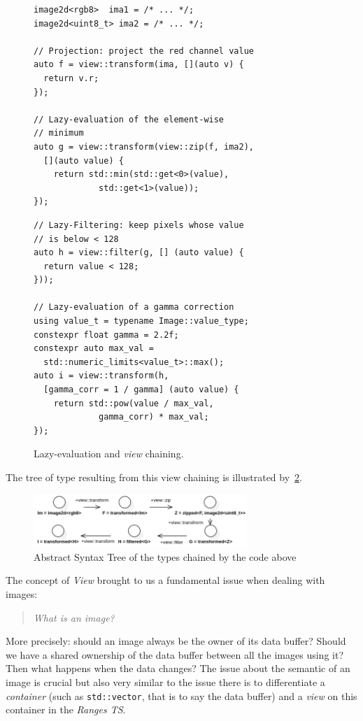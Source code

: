 \begin{figure}[htbp]
  \begin{minipage}[l]{0.48\linewidth}
    \begin{verbatim}
image2d<rgb8>  ima1 = /* ... */;
image2d<uint8_t> ima2 = /* ... */;

// Projection: project the red channel value
auto f = view::transform(ima, [](auto v) {
  return v.r;
});

// Lazy-evaluation of the element-wise
// minimum
auto g = view::transform(view::zip(f, ima2),
  [](auto value) {
    return std::min(std::get<0>(value),
             std::get<1>(value));
});
\end{verbatim}
  \end{minipage}
  \hfill
  \begin{minipage}[l]{0.48\linewidth}
    \begin{verbatim}
// Lazy-Filtering: keep pixels whose value
// is below < 128
auto h = view::filter(g, [] (auto value) {
  return value < 128;
}));

// Lazy-evaluation of a gamma correction
using value_t = typename Image::value_type;
constexpr float gamma = 2.2f;
constexpr auto max_val =
  std::numeric_limits<value_t>::max();
auto i = view::transform(h,
  [gamma_corr = 1 / gamma] (auto value) {
    return std::pow(value / max_val,
             gamma_corr) * max_val;
});
\end{verbatim}
  \end{minipage}

  \caption{Lazy-evaluation and \emph{view} chaining.}
  \label{fig.lazy}
\end{figure}

\noindent The tree of type resulting from this view chaining is illustrated by~\cref{fig.viewAST}.

\begin{figure}[htb]
  \includegraphics[height=2cm]{figs/viewAST.png}
  \caption{Abstract Syntax Tree of the types chained by the code above}
  \label{fig.viewAST}
\end{figure}

The concept of \emph{View} brought to us a fundamental issue when dealing with images: \blockquote{\emph{What is an
    image?}}. More precisely: should an image always be the owner of its data buffer? Should we have a shared ownership of
the data buffer between all the images using it? Then what happens when the data changes? The issue about the semantic
of an image is crucial but also very similar to the issue there is to differentiate a \emph{container} (such as
\texttt{std::vector}, that is to say the data buffer) and a \emph{view} on this container in the \emph{Ranges TS}.


